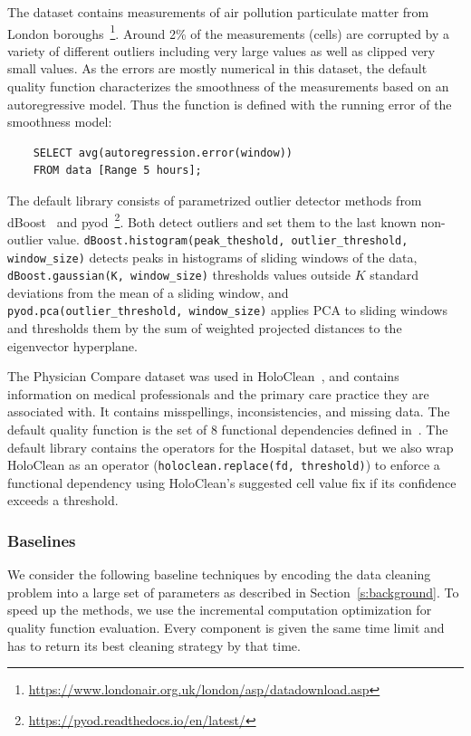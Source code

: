  The dataset contains measurements of air pollution particulate matter from London boroughs~\footnote{\url{https://www.londonair.org.uk/london/asp/datadownload.asp}}. Around 2\% of the measurements (cells) are corrupted by a variety of different outliers including very large values as well as clipped very small values.  As the errors are mostly numerical in this dataset, the default quality function characterizes the smoothness of the measurements based on an autoregressive model.  Thus the function is defined with the running error of the smoothness model:
\begin{verbatim}
    SELECT avg(autoregression.error(window))
    FROM data [Range 5 hours];
\end{verbatim}
\noindent The default library consists of parametrized outlier detector methods from dBoost~\cite{mariet2016outlier} and pyod~\footnote{\url{https://pyod.readthedocs.io/en/latest/}}.  Both detect outliers and set them to the last known non-outlier value. \texttt{dBoost.histogram(peak\_theshold, outlier\_threshold, window\_size)} detects peaks in histograms of sliding windows of the data, \texttt{dBoost.gaussian(K, window\_size)} thresholds values outside $K$ standard deviations  from the mean of a sliding window, and \texttt{pyod.pca(outlier\_threshold, window\_size)}  applies PCA to sliding windows and thresholds them by the sum of weighted projected distances to the eigenvector hyperplane.

 The Physician Compare dataset was used in HoloClean~\cite{rekatsinas2017holoclean}, and contains information on medical professionals and the primary care practice they are associated with.  It contains misspellings, inconsistencies, and missing data. The default quality function is the set of 8 functional dependencies defined in~\cite{rekatsinas2017holoclean}.  The default library contains the operators for the Hospital dataset, but we also wrap HoloClean as an operator (\texttt{holoclean.replace(fd, threshold)}) to enforce a functional dependency using HoloClean's suggested cell value fix if its confidence exceeds a threshold.

\subsubsection{Baselines}
We consider the following baseline techniques by encoding the data cleaning problem into a large set of parameters as described in Section~\ref{s:background}. To speed up the methods, we use the incremental computation optimization for quality function evaluation. Every component is given the same time limit and has to return its best cleaning strategy by that time. 

